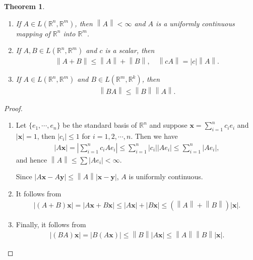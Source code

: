 \documentclass[10pt]{book}
\newtheorem{theorem}{Theorem}[chapter]
\theoremstyle{definition}
\numberwithin{equation}{chapter}
\begin{document}
\medskip

\begin{theorem}
~\begin{enumerate}[label=(\alph*)]
    \item If $A \in L(\mathbb{R}^n,\mathbb{R}^m)$, then $\left\|A\right\| < \infty$ and $A$ is a uniformly continuous mapping of $\mathbb{R}^n$ into $\mathbb{R}^m$.
    
    \item If $A, B \in L(\mathbb{R}^n,\mathbb{R}^m)$ and $c$ is a scalar, then
    \begin{align*}
        \left\|A + B\right\| \leq \left\|A\right\| + \left\|B\right\|, \quad \left\|cA\right\| = \left|c\right| \left\|A\right\|.
    \end{align*}
    
    \item If $A \in L(\mathbb{R}^n,\mathbb{R}^m)$ and $B \in L(\mathbb{R}^m,\mathbb{R}^k)$, then
    \begin{align*}
        \left\|BA\right\| \leq \left\|B\right\| \left\|A\right\|.
    \end{align*}
\end{enumerate}
\end{theorem}


\begin{proof}
~\begin{enumerate}[label=(\alph*)]
    \item Let $\{e_1, \cdots, e_n\}$ be the standard basis of $\mathbb{R}^n$ and suppose $\mathbf{x} = \sum^n_{i=1} c_i e_i$ and $\left|\mathbf{x}\right| = 1$, then $\left|c_i\right| \leq 1$ for $i = 1,2,\cdots,n$. Then we have
    \begin{align*}
        \left|A\mathbf{x}\right| = \left|\sum^n_{i=1} c_i Ae_i\right| \leq \sum^n_{i=1} \left|c_i\right| \left|A e_i\right| \leq \sum^n_{i=1} \left|A e_i\right|,
    \end{align*}
    and hence $\left\|A\right\| \leq \sum \left|A e_i\right| < \infty$. 
    
    Since $\left|A\mathbf{x} - A\mathbf{y}\right| \leq \left\|A\right\| \left|\mathbf{x} - \mathbf{y}\right|$, $A$ is uniformly continuous.
    
    \item It follows from
    \begin{align*}
        \left|(A+B)\mathbf{x}\right| = \left|A\mathbf{x} + B\mathbf{x}\right| \leq \left|A\mathbf{x}\right| + \left|B\mathbf{x}\right| \leq \left(\left\|A\right\| + \left\|B\right\|\right) \left|\mathbf{x}\right|.
    \end{align*}
    
    \item Finally, it follows from
    \begin{align*}
        \left|(BA)\mathbf{x}\right| = \left|B(A\mathbf{x})\right| \leq \left\|B\right\| \left|A\mathbf{x}\right| \leq \left\|A\right\| \left\|B\right\| \left|\mathbf{x}\right|.
    \end{align*}
\end{enumerate}
\end{proof}
\end{document}

